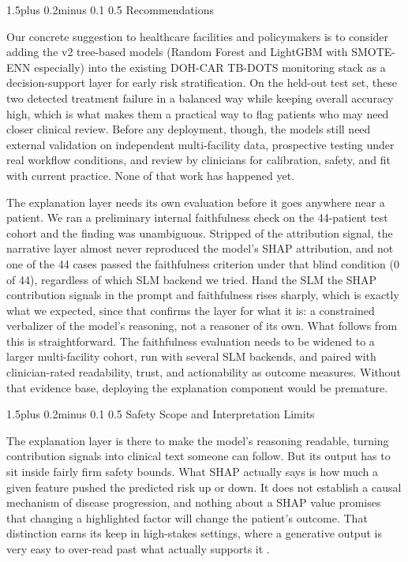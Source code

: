 \documentclass[12pt]{article}
\makeatletter
\renewcommand{\_}{\textunderscore\allowbreak}
\renewcommand{\subsection}{\@startsection{subsection}{2}{0pt}%
  {1.5\baselineskip plus 0.2\baselineskip minus 0.1\baselineskip}%
  {0.5\baselineskip}%
  {\bfseries\normalsize}}
\makeatother
\begin{document}
\subsection{Recommendations}

Our concrete suggestion to healthcare facilities and policymakers is to consider adding the v2 tree-based models (Random Forest and LightGBM with SMOTE-ENN especially) into the existing DOH-CAR TB-DOTS monitoring stack as a decision-support layer for early risk stratification. On the held-out test set, these two detected treatment failure in a balanced way while keeping overall accuracy high, which is what makes them a practical way to flag patients who may need closer clinical review. Before any deployment, though, the models still need external validation on independent multi-facility data, prospective testing under real workflow conditions, and review by clinicians for calibration, safety, and fit with current practice. None of that work has happened yet.

The explanation layer needs its own evaluation before it goes anywhere near a patient. We ran a preliminary internal faithfulness check on the 44-patient test cohort and the finding was unambiguous. Stripped of the attribution signal, the narrative layer almost never reproduced the model's SHAP attribution, and not one of the 44 cases passed the faithfulness criterion under that blind condition (0 of 44), regardless of which SLM backend we tried. Hand the SLM the SHAP contribution signals in the prompt and faithfulness rises sharply, which is exactly what we expected, since that confirms the layer for what it is: a constrained verbalizer of the model's reasoning, not a reasoner of its own. What follows from this is straightforward. The faithfulness evaluation needs to be widened to a larger multi-facility cohort, run with several SLM backends, and paired with clinician-rated readability, trust, and actionability as outcome measures. Without that evidence base, deploying the explanation component would be premature.

\subsection{Safety Scope and Interpretation Limits}

The explanation layer is there to make the model's reasoning readable, turning contribution signals into clinical text someone can follow. But its output has to sit inside fairly firm safety bounds. What SHAP actually says is how much a given feature pushed the predicted risk up or down. It does not establish a causal mechanism of disease progression, and nothing about a SHAP value promises that changing a highlighted factor will change the patient's outcome. That distinction earns its keep in high-stakes settings, where a generative output is very easy to over-read past what actually supports it \citep{ref42, ref43}.
\end{document}
